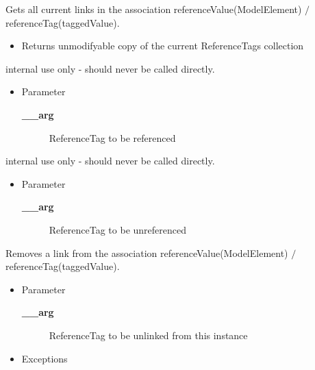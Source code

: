 \begin{desc}Gets all current links in the association referenceValue(ModelElement)
  $/$ referenceTag(taggedValue).
\begin{itemize}
\item{Returns unmodifyable copy of the current ReferenceTags collection }
\end{itemize}
\end{desc}

\begin{desc}internal use only - should never be called directly.
\begin{itemize}
\item{Parameter
  \begin{description}
   \item[{\bf \_\_arg}]{ReferenceTag to be referenced}
  \end{description}}
\end{itemize}
\end{desc}

\begin{desc}internal use only - should never be called directly.
\begin{itemize}
\item{Parameter
  \begin{description}
   \item[{\bf \_\_arg}]{ReferenceTag to be unreferenced}
  \end{description}}
\end{itemize}
\end{desc}

\begin{desc}Removes a link from the association referenceValue(ModelElement)
  $/$ referenceTag(taggedValue).
\begin{itemize}
\item{Parameter
  \begin{description}
   \item[{\bf \_\_arg}]{ReferenceTag to be unlinked from this instance}
  \end{description}}
\end{itemize}
\begin{itemize}
\item{{Exceptions}
}
\end{itemize}
\end{desc}

